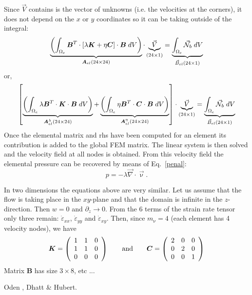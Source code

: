 Since $\vec V$ contains is the vector of unknowns (i.e. the velocities at the corners), 
it does not depend on the $x$ or $y$ coordinates
so it can be taking outside of the integral:
\[
\underbrace{
\left(\int_{\Omega_e} {\bm B}^T \cdot [ \lambda {\bm K} + \eta {\bm C} ] \cdot {\bm B} \;  dV \right) 
}_{\bm A_{el}(24 \times 24)}
\cdot 
\underbrace{
{\vec V}
}_{(24\times 1)}
=
\underbrace{
\int_{\Omega_e} {\vec {{\mathcal{N}}}}_b \; dV
}_{\vec B_{el} (24\times 1)}
\]
or, 
\[
\left[
\underbrace{
\left(\int_{\Omega_e} \lambda {\bm B}^T \cdot {\bm K} \cdot {\bm B} \; dV \right) 
}_{\bm A_{el}^\lambda(24 \times 24)}
+
\underbrace{
\left(\int_{\Omega_e}  \eta {\bm B}^T \cdot {\bm C}  \cdot {\bm B} \;  dV \right) 
}_{\bm A_{el}^\eta(24 \times 24)}
\right]
\cdot 
\underbrace{
{\vec V}
}_{(24\times 1)}
=
\underbrace{
\int_{\Omega_e} {\vec {{\mathcal{N}}}}_b \; dV
}_{\vec B_{el} (24\times 1)}
\]
Once the elemental matrix and rhs have been computed for an element
its contribution is added to the global FEM matrix. 
The linear system is then solved and the velocity field at all nodes 
is obtained. 
From this velocity field the elemental pressure can be recovered by means of 
Eq.~\eqref{penal}: 
\[
p = -\lambda \vec\nabla\cdot\vec\upnu.
\]



In two dimensions the equations above are very similar. Let us assume that the 
flow is taking place in the $xy$-plane and that the domain is infinite in the 
$z$-direction. Then $w=0$ and $\partial_z \rightarrow 0$. From the 6 terms
of the strain rate tensor only three remain: 
$\dot\varepsilon_{xx}$, $\dot\varepsilon_{yy}$ and $\dot\varepsilon_{xy}$.
Then, since $m_\upnu=4$ (each element has 4 velocity nodes), we have 
\[
{\bm K}=
\left(
\begin{array}{ccc}
1 & 1 & 0 \\
1 & 1 & 0 \\
0 & 0 & 0 \\
\end{array}
\right)
\qquad
{\rm and}
\qquad
{\bm C} = 
\left(
\begin{array}{ccc}
2 & 0 & 0 \\ 
0 & 2 & 0 \\
0 & 0 & 1 
\end{array}
\right)
\]
Matrix ${\bm B}$ has size $3\times 8$, etc ...  




\Literature Oden \etal \cite{odks82}, Dhatt \& Hubert\cite{dhhu86}.
